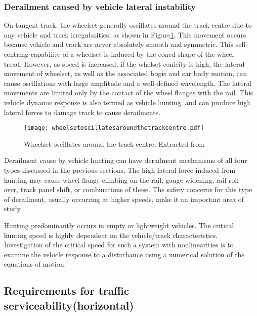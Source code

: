 \subsubsection{Derailment caused by vehicle lateral instability}
On tangent track, the wheelset generally oscillates around the track centre due to any vehicle and track irregularities, as shown in Figure\ref{fig:wheelsetoscillatesaroundthetrackcentre}. This movement occurs because vehicle and track are never absolutely smooth and symmetric. This self-centring capability of a wheelset is induced by the coned shape of the wheel tread. However, as speed is increased, if the whelset conicity is high, the lateral movement of wheelset, as well as the associated bogie and car body motion, can cause oscillations with large amplitude  and a well-defined wavelength. The lateral movements are limited only by the contact of the wheel flanges with the rail. This vehicle dynamic response is also termed as vehicle hunting, and can produce high lateral forces to damage track to cause derailments.

\begin{figure}[h]
    \centering
    \texttt{[image: wheelsetoscillatesaroundthetrackcentre.pdf]}
    \caption{Wheelset oscillates around the track centre. Extracted from \cite[Figure8.28]{iwnicki2006handbook}}
    \label{fig:wheelsetoscillatesaroundthetrackcentre}
\end{figure}

Derailment cause by vehicle hunting can have derailment mechanisms of all four types discussed in the previous sections. The high lateral force induced from hunting may cause wheel flange climbing on the rail, gauge widening, rail roll-over, track panel shift, or combinations of these. The safety concerns for this type of derailment, usually occurring at higher speeds, make it an important area of study.

Hunting predominantly occurs in empty or lightweight vehicles. The critical hunting speed is highly dependent on the vehicle/track characteristics. Investigation of the critical speed for such a system with nonlinearities is to examine the vehicle response to a disturbance using a numerical solution of the equations of motion.

\subsection{Requirements for traffic serviceability(horizontal)}


